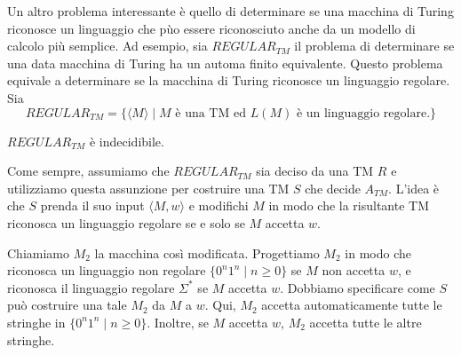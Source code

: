\documentclass[12pt]{report}
\newcounter{theorem}
\begin{document}
Un altro problema interessante è quello di determinare se una macchina di Turing riconosce un linguaggio che pùo essere riconosciuto anche da un modello di calcolo più semplice. Ad esempio, sia $REGULAR_{TM}$ il problema di determinare se una data macchina di Turing ha un automa finito equivalente. Questo problema equivale a determinare se la macchina di Turing riconosce un linguaggio regolare. Sia
\[
REGULAR_{TM} = \{\langle M \rangle \mid M \text{ è una TM ed $L(M)$ è un linguaggio regolare.}\}
\]
\begin{theorem}{}{}
	$REGULAR_{TM}$ è indecidibile.
\end{theorem}
Come sempre, assumiamo che $REGULAR_{TM}$ sia deciso da una TM $R$ e utilizziamo questa assunzione per costruire una TM $S$ che decide $A_{TM}$. L'idea è che $S$ prenda il suo input $\langle M, w \rangle$ e modifichi $M$ in modo che la risultante TM riconosca un linguaggio regolare se e solo se $M$ accetta $w$.

Chiamiamo $M_2$ la macchina così modificata. Progettiamo $M_2$ in modo che riconosca un linguaggio non regolare $\{0^n1^n \mid n \geq 0\}$ se $M$ non accetta $w$, e riconosca il linguaggio regolare $\Sigma^*$ se $M$ accetta $w$. Dobbiamo specificare come $S$ può costruire una tale $M_2$ da $M$ a $w$. Qui, $M_2$ accetta automaticamente tutte le stringhe in $\{0^n1^n \mid n \geq 0\}$. Inoltre, se $M$ accetta $w$, $M_2$ accetta tutte le altre stringhe.
\end{document}

